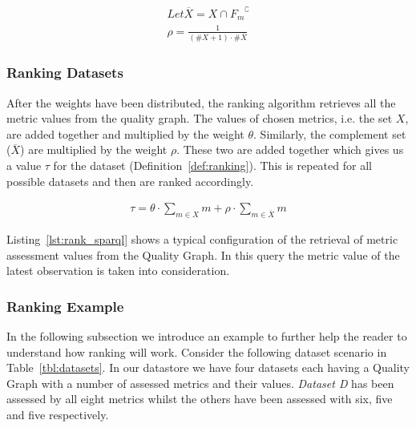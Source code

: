 \begin{Def1}
\label{def:weight_adjustment_smaller}
\begin{align*}
\mathit{Let} \overline{X} = X \cap {F_{m}}^{\complement} \\
\rho = \frac{1}{(\#X + 1) \cdot \#\overline{X}}
\end{align*}
\end{Def1}

\subsubsection{Ranking Datasets}
After the weights have been distributed, the ranking algorithm retrieves all the metric values from the quality graph.
The values of chosen metrics, i.e. the set $X$, are added together and multiplied by the weight $\theta$.
Similarly, the complement set ($\overline{X}$) are multiplied by the weight $\rho$.
These two are added together which gives us a value $\tau$ for the dataset (Definition~\ref{def:ranking}).
This is repeated for all possible datasets and then are ranked accordingly.
\begin{Def1}
\label{def:ranking}
\begin{align*}
\tau = \theta \cdot \sum_{m\in X} m + \rho \cdot \sum_{m\in\overline{X}} m
\end{align*}
\end{Def1}

Listing~\ref{lst:rank_sparql} shows a typical configuration of the retrieval of metric assessment values from the Quality Graph.
In this query the metric value of the latest observation is taken into consideration.


\subsubsection{Ranking Example}
In the following subsection we introduce an example to further help the reader to understand how ranking will work.
Consider the following dataset scenario in Table~\ref{tbl:datasets}.
In our datastore we have four datasets each having a Quality Graph with a number of assessed metrics and their values.
\textit{Dataset D} has been assessed by all eight metrics whilst the others have been assessed with six, five and five respectively.

